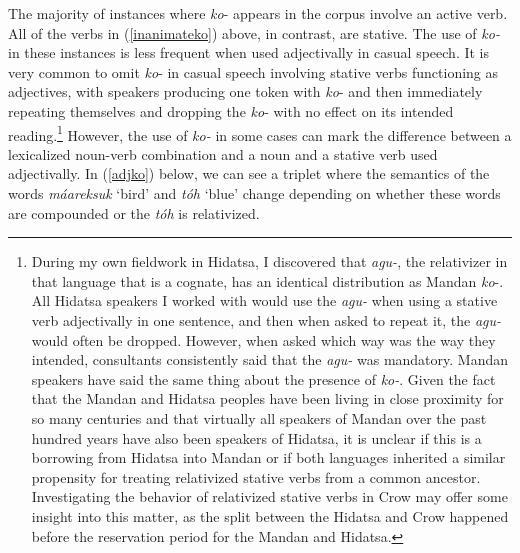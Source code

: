 The majority of instances where \textit{ko}- appears in the corpus involve an active verb. All of the verbs in (\ref{inanimateko}) above, in contrast, are stative. The use of \textit{ko-} in these instances is less frequent when used adjectivally in casual speech. It is very common to omit \textit{ko}- in casual speech involving stative verbs functioning as adjectives, with speakers producing one token with \textit{ko}- and then immediately repeating themselves and dropping the \textit{ko}- with no effect on its intended reading.\footnote{During my own fieldwork in Hidatsa, I discovered that \textit{agu-}, the relativizer in that language that is a cognate, has an identical distribution as Mandan \textit{ko}-. All Hidatsa speakers I worked with would use the \textit{agu-} when using a stative verb adjectivally in one sentence, and then when asked to repeat it, the \textit{agu-} would often be dropped. However, when asked which way was the way they intended, consultants consistently said that the \textit{agu-} was mandatory. Mandan speakers have said the same thing about the presence of \textit{ko-}. Given the fact that the Mandan and Hidatsa peoples have been living in close proximity for so many centuries and that virtually all speakers of Mandan over the past hundred years have also been speakers of Hidatsa, it is unclear if this is a borrowing from Hidatsa into Mandan or if both languages inherited a similar propensity for treating relativized stative verbs from a common ancestor. Investigating the behavior of relativized stative verbs in Crow may offer some insight into this matter, as the split between the Hidatsa and Crow happened before the reservation period for the Mandan and Hidatsa.} However, the use of \textit{ko-} in some cases can mark the difference between a lexicalized noun-verb combination and a noun and a stative verb used adjectivally. In (\ref{adjko}) below, we can see a triplet where the semantics of the words \textit{máareksuk} `bird' and \textit{tóh} `blue' change depending on whether these words are compounded or the \textit{tóh} is relativized.

